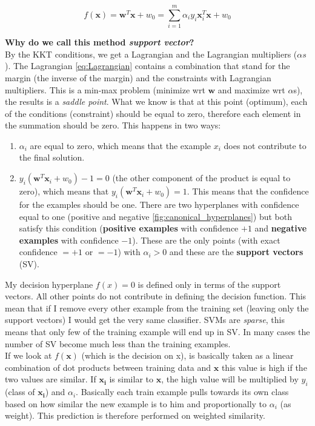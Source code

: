             $$f(\pmb{x}) = \pmb{w}^T \pmb{x} + w_0 = \sum_{i=1}^m \alpha_i y_i \pmb{x}_i^T \pmb{x} + w_0$$

            \textbf{Why do we call this method \textit{support vector}?}\\
            By the KKT conditions, we get a Lagrangian and the Lagrangian multipliers ($\alpha s$). The Lagrangian \ref{eq:Lagrangian} contains a combination that stand for the margin (the inverse of the margin) and the constraints with Lagrangian multipliers. 
            This is a min-max problem (minimize wrt $\pmb{w}$ and maximize wrt $\alpha $s), the results is a \textit{saddle point}. 
            What we know is that at this point (optimum), each of the conditions (constraint) should be equal to zero, therefore each element in the summation should be zero. This happens in two ways:
            \begin{enumerate}
                \item $\alpha_i$ are equal to zero, which means that the example $x_i$ does not contribute to the final solution.
                \item $y_i(\pmb{w}^T \pmb{x}_i + w_0) - 1 = 0$ (the other component of the product is equal to zero), which means that $y_i(\pmb{w}^T \pmb{x}_i + w_0) = 1$. 
                This means that the confidence for the examples should be one. There are two hyperplanes with confidence equal to one (positive and negative \ref{fig:canonical_hyperplanes}) but both satisfy this condition (\textbf{positive examples} with confidence $+1$ and \textbf{negative examples} with confidence $-1$). These are the only points (with exact confidence $=+1$ or $=-1$) with $\alpha_i > 0$ and these are the \textbf{support vectors} (SV).
            \end{enumerate}
            My decision hyperplane $f(x) = 0$ is defined only in terms of the support vectors. 
            All other points do not contribute in defining the decision function. This mean that if I remove every other example from the training set (leaving only the support vectors) I would get the very same classifier.           
            SVMs are \textit{sparse}, this means that only few of the training example will end up in SV. In many cases the number of SV become much less than the training examples.\\

            If we look at $f(\pmb{x})$ (which is the decision on x), is basically taken as a linear combination of dot products between training data and $\pmb{x}$ this value is high if the two values are similar. 
            If $\pmb{x_i}$ is similar to $\pmb{x}$, the high value will be multiplied by $y_i$ (class of $\pmb{x_i}$) and $\alpha_i$. Basically each train example pulls towards its own class based on how similar the new example is to him and proportionally to $\alpha_i$ (as weight).
            This prediction is therefore performed on weighted similarity.\\

